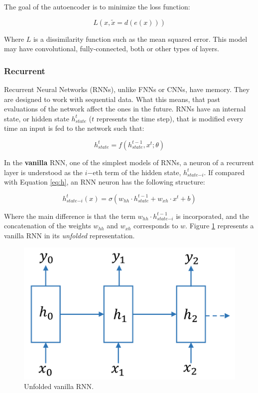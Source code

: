 The goal of the autoencoder is to minimize the loss function:

\begin{equation}
\label{eq:ae}
    L(x, \widetilde x = d(e(x)))
\end{equation}

Where $L$ is a dissimilarity function such as the mean squared error. This model may have convolutional, fully-connected, both or other types of layers.

\subsubsection{Recurrent}
    
Recurrent Neural Networks (RNNs), unlike FNNs or CNNs, have memory. They are designed to work with sequential data. What this means, that past evaluations of the network affect the ones in the future. RNNs have an internal state, or hidden state $h_{state}^{t}$ ($t$ represents the time step), that is modified every time an input is fed to the network such that:

\begin{equation}
    h_{state}^{t} = f(h_{state}^{t-1}, x^{t}; \theta)
\end{equation}

In the \textbf{vanilla} RNN, one of the simplest models of RNNs, a neuron of a recurrent layer is understood as the $i\mathrm{-eth}$ term of the hidden state, $h_{state\mathrm{-}i}^{t}$. If compared with Equation \ref{eq:h}, an RNN neuron has the following structure:

\begin{equation}
    h_{state\mathrm{-}i}^{t}(x) = \sigma(w_{hh} \cdot h_{state}^{t-1} + w_{xh} \cdot x^{t} + b)
\end{equation}

Where the main difference is that the term $w_{hh} \cdot h_{state\mathrm{-}i}^{t-1}$ is incorporated, and the concatenation of the weights $w_{hh}$ and $w_{xh}$ corresponds to $w$. Figure \ref{fig:rnn_unfolded} represents a vanilla RNN in its \emph{unfolded} representation.

\begin{figure}[h]
    \centering
    \includegraphics[width=0.4\linewidth]{imagenes/cap1/unfolded_rnn.pdf}
    \caption{Unfolded vanilla RNN.}
    \label{fig:rnn_unfolded}
\end{figure}

